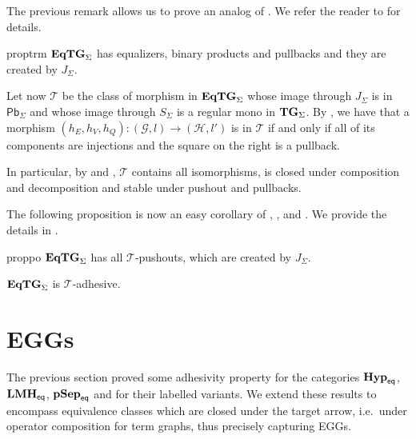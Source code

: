 \documentclass[3p]{elsarticle}
\newcommand{\pbc}{\mathsf{Pb}}
\newcommand{\catname}[1]{\textbf{\textup{#1}}}
\newcommand{\EqHyp}{\catname{Hyp}_{\mathsf{eq}}} %
\newcommand{\EqpsHyp}{\catname{pSep}_{\mathsf{eq}}}
\newcommand{\Eqlmo}{\catname{LMH}_{\mathsf{eq}}}
\newcommand{\EqTG}{\catname{EqTG}}
\newcommand{\tg}[0]{\catname{TG}_{\Sigma}}
\theoremstyle{remark}
\theoremstyle{definition}
\begin{document}
 The previous remark allows us to prove an analog of . We refer the reader to  for details.
 
 \begin{restatable}{prop}{trm}\label{prop:term}
$\EqTG_{\Sigma}$ has equalizers, binary products and pullbacks and they are created by $J_\Sigma$.
 \end{restatable}
 
\noindent
\begin{minipage}[l]{.8\linewidth}
	Let now $\mathcal{T}$ be the class of morphism in $\EqTG_{\Sigma}$ whose image through $J_\Sigma$ is in $\pbc_\Sigma$ and whose image through $S_\Sigma$ is a regular mono in $\tg$.  By , we have that a morphism $(h_E, h_V, h_Q)\colon (\mathcal{G},l)\to (\mathcal{H}, l')$ is in $\mathcal{T}$ if and only if all of its components are injections and the square on the right is a pullback.
\end{minipage} \hfill 
\begin{minipage}[r]{.18\linewidth}
\end{minipage} 

In particular, by  and , $\mathcal{T}$ contains all isomorphisms, is closed under composition and decomposition and stable under pushout and pullbacks.

The following proposition is now an easy corollary of , , and . We provide the details in .


\begin{restatable}{prop}{po}\label{prop:po}
$\EqTG_{\Sigma}$ has all $\mathcal{T}$-pushouts, which are created by $J_{\Sigma}$.
\end{restatable}

\begin{cor}\label{cor:tade}
	$\EqTG_{\Sigma}$ is $\mathcal{T}$-adhesive.
\end{cor}

\fi 
\section{EGGs}
\label{eggs}
The previous section proved some adhesivity property for the categories $\EqHyp$, $\Eqlmo$,  $\EqpsHyp$ and for their labelled variants. We extend these results to
encompass equivalence classes which are closed under the target arrow, i.e.~under operator composition for term graphs, thus precisely capturing EGGs.
\end{document}
